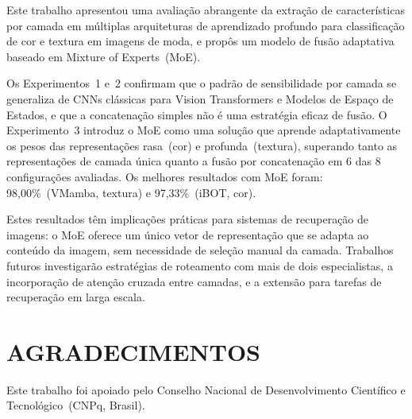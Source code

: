 \documentclass[letterpaper, 10 pt, conference]{ieeeconf}
\begin{document}
Este trabalho apresentou uma avaliação abrangente da extração de
características por camada em múltiplas arquiteturas de aprendizado
profundo para classificação de cor e textura em imagens de moda, e propôs
um modelo de fusão adaptativa baseado em Mixture of Experts~(MoE).

Os Experimentos~1 e~2 confirmam que o padrão de sensibilidade por camada
se generaliza de CNNs clássicas para Vision Transformers e Modelos de
Espaço de Estados, e que a concatenação simples não é uma estratégia
eficaz de fusão.
O Experimento~3 introduz o MoE como uma solução que aprende
adaptativamente os pesos das representações rasa~(cor) e
profunda~(textura), superando tanto as representações de camada única
quanto a fusão por concatenação em 6 das 8 configurações avaliadas.
Os melhores resultados com MoE foram: 98,00\%~(VMamba, textura) e
97,33\%~(iBOT, cor).

Estes resultados têm implicações práticas para sistemas de recuperação de
imagens: o MoE oferece um único vetor de representação que se adapta ao
conteúdo da imagem, sem necessidade de seleção manual da camada.
Trabalhos futuros investigarão estratégias de roteamento com mais de dois
especialistas, a incorporação de atenção cruzada entre camadas, e a
extensão para tarefas de recuperação em larga escala.

\section*{AGRADECIMENTOS}

Este trabalho foi apoiado pelo Conselho Nacional de Desenvolvimento
Científico e Tecnológico~(CNPq, Brasil).
\end{document}
